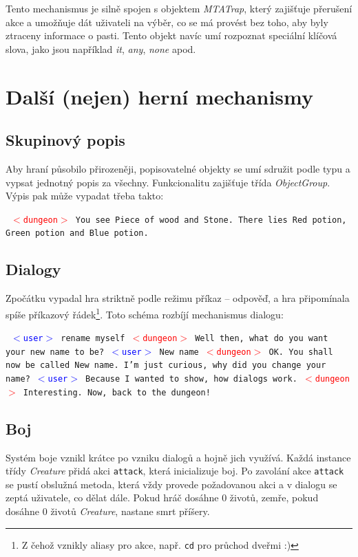 \documentclass[11pt, a4paper]{article}
\def\class#1{\emph{#1}}
\newenvironment{example}%
{\smallskip\noindent\ignorespaces\obeylines\tt}%
{\smallskip\par\noindent
\ignorespacesafterend}
\def\user{\textcolor{blue}{$<$user$>$ }}
\def\dung{\textcolor{red}{$<$dungeon$>$ }}
\begin{document}
Tento mechanismus je silně spojen s objektem \class{MTATrap}, který zajišťuje přerušení akce a umožňuje dát uživateli na výběr, co se má provést bez toho, aby byly ztraceny informace o pasti. Tento objekt navíc umí rozpoznat speciální klíčová slova, jako jsou například \textit{it}, \textit{any}, \textit{none} apod.

\section{Další (nejen) herní mechanismy}

\subsection{Skupinový popis}

Aby hraní působilo přirozeněji, popisovatelné objekty se umí sdružit podle typu a vypsat jednotný popis za všechny. Funkcionalitu zajišťuje třída \class{ObjectGroup}. Výpis pak může vypadat třeba takto:

\begin{example}
\dung You see Piece of wood and Stone. There lies Red potion, Green
potion and Blue potion. 
\end{example}

\subsection{Dialogy}
\label{dialogs}
Zpočátku vypadal hra striktně podle režimu příkaz -- odpověď, a hra připomínala spíše příkazový řádek\footnote{Z čehož vznikly aliasy pro akce, např. \texttt{cd} pro průchod dveřmi :)}. Toto schéma rozbíjí mechanismus dialogu:

\begin{example}
\user rename myself
\dung Well then, what do you want your new name to be?
\user New name
\dung OK. You shall now be called New name. I'm just curious, why did 
you change your name?
\user Because I wanted to show, how dialogs work.
\dung Interesting. Now, back to the dungeon!
\end{example}

\subsection{Boj}
\label{combat}
Systém boje vznikl krátce po vzniku dialogů a hojně jich využívá. Každá instance třídy \class{Creature} přidá akci \texttt{attack}, která inicializuje boj. Po zavolání akce \texttt{attack} se pustí obslužná metoda, která vždy provede požadovanou akci a v dialogu se zeptá uživatele, co dělat dále. Pokud hráč dosáhne 0 životů, zemře, pokud dosáhne 0 životů \class{Creature}, nastane smrt příšery.
\end{document}
